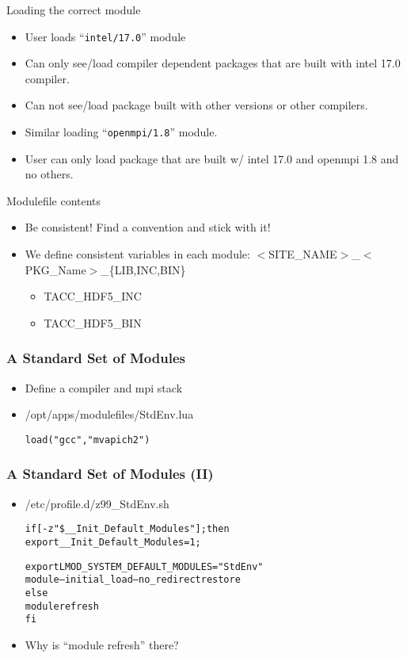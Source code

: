 \documentclass[dvipsnames,aspectratio=169]{beamer}
\begin{document}
\begin{frame}{Loading the correct module}
  \begin{itemize}
    \item User loads ``\texttt{intel/17.0}'' module
    \item Can only see/load compiler dependent packages that are built with
      intel 17.0 compiler.
    \item Can not see/load package built with other versions or other compilers.
    \item Similar loading ``\texttt{openmpi/1.8}'' module.
    \item User can only load package that are built w/ intel 17.0 and
      openmpi 1.8 and no others.
  \end{itemize}
\end{frame}


\begin{frame}{Modulefile contents}
  \begin{itemize}
    \item Be consistent! Find a convention and stick with it!
    \item We define consistent variables in each module:
      $<$SITE\_NAME$>$\_$<$PKG\_Name$>$\_\{LIB,INC,BIN\}
      \begin{itemize}
        \item TACC\_HDF5\_INC
        \item TACC\_HDF5\_BIN
      \end{itemize}
  \end{itemize}
\end{frame}


\begin{frame}[fragile]
    \frametitle{A Standard Set of Modules}
  \begin{itemize}
    \item Define a compiler and mpi stack
    \item /opt/apps/modulefiles/StdEnv.lua
  {\small
    \begin{alltt}
load("gcc","mvapich2")
    \end{alltt}
}
  \end{itemize}
\end{frame}


\begin{frame}[fragile]
    \frametitle{A Standard Set of Modules (II)}
  \begin{itemize}
    \item /etc/profile.d/z99\_StdEnv.sh
  {\small
    \begin{alltt}
   if [ -z "\$\_\_Init\_Default\_Modules" ]; then
      export \_\_Init\_Default\_Modules=1;

      export LMOD\_SYSTEM\_DEFAULT\_MODULES="StdEnv"
      module --initial\_load --no\_redirect restore
   else
      module refresh
   fi
    \end{alltt}
}
    \item Why is  ``module refresh'' there?
  \end{itemize}
\end{frame}
\end{document}
